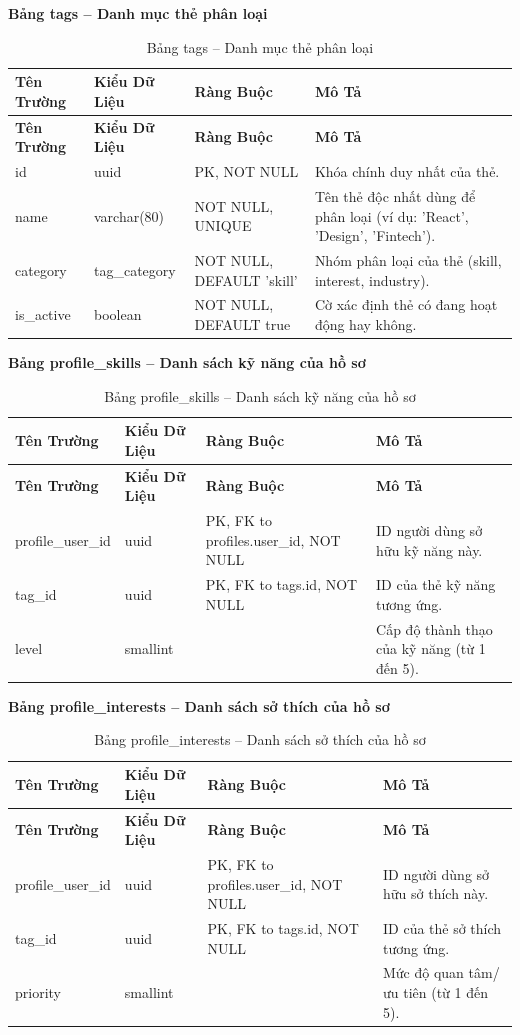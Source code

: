 \textbf{Bảng tags -- Danh mục thẻ phân loại}
\label{table:tags}
\begin{longtable}{|p{3cm}|p{2.5cm}|p{3.5cm}|p{5cm}|}
\caption{Bảng tags -- Danh mục thẻ phân loại} \\
\hline
\textbf{Tên Trường} & \textbf{Kiểu Dữ Liệu} & \textbf{Ràng Buộc} & \textbf{Mô Tả} \\
\hline
\endfirsthead
\hline
\textbf{Tên Trường} & \textbf{Kiểu Dữ Liệu} & \textbf{Ràng Buộc} & \textbf{Mô Tả} \\
\hline
\endhead
id & uuid & PK, NOT NULL & Khóa chính duy nhất của thẻ. \\
\hline
name & varchar(80) & NOT NULL, UNIQUE & Tên thẻ độc nhất dùng để phân loại (ví dụ: 'React', 'Design', 'Fintech'). \\
\hline
category & tag\_category & NOT NULL, DEFAULT 'skill' & Nhóm phân loại của thẻ (skill, interest, industry). \\
\hline
is\_active & boolean & NOT NULL, DEFAULT true & Cờ xác định thẻ có đang hoạt động hay không. \\
\hline
\end{longtable}

\textbf{Bảng profile\_skills -- Danh sách kỹ năng của hồ sơ}
\label{table:profile_skills}
\begin{longtable}{|p{3cm}|p{2.5cm}|p{3.5cm}|p{5cm}|}
\caption{Bảng profile\_skills -- Danh sách kỹ năng của hồ sơ} \\
\hline
\textbf{Tên Trường} & \textbf{Kiểu Dữ Liệu} & \textbf{Ràng Buộc} & \textbf{Mô Tả} \\
\hline
\endfirsthead
\hline
\textbf{Tên Trường} & \textbf{Kiểu Dữ Liệu} & \textbf{Ràng Buộc} & \textbf{Mô Tả} \\
\hline
\endhead
profile\_user\_id & uuid & PK, FK to profiles.user\_id, NOT NULL & ID người dùng sở hữu kỹ năng này. \\
\hline
tag\_id & uuid & PK, FK to tags.id, NOT NULL & ID của thẻ kỹ năng tương ứng. \\
\hline
level & smallint & & Cấp độ thành thạo của kỹ năng (từ 1 đến 5). \\
\hline
\end{longtable}

\textbf{Bảng profile\_interests -- Danh sách sở thích của hồ sơ}
\label{table:profile_interests}
\begin{longtable}{|p{3cm}|p{2.5cm}|p{3.5cm}|p{5cm}|}
\caption{Bảng profile\_interests -- Danh sách sở thích của hồ sơ} \\
\hline
\textbf{Tên Trường} & \textbf{Kiểu Dữ Liệu} & \textbf{Ràng Buộc} & \textbf{Mô Tả} \\
\hline
\endfirsthead
\hline
\textbf{Tên Trường} & \textbf{Kiểu Dữ Liệu} & \textbf{Ràng Buộc} & \textbf{Mô Tả} \\
\hline
\endhead
profile\_user\_id & uuid & PK, FK to profiles.user\_id, NOT NULL & ID người dùng sở hữu sở thích này. \\
\hline
tag\_id & uuid & PK, FK to tags.id, NOT NULL & ID của thẻ sở thích tương ứng. \\
\hline
priority & smallint & & Mức độ quan tâm/ưu tiên (từ 1 đến 5). \\
\hline
\end{longtable}

